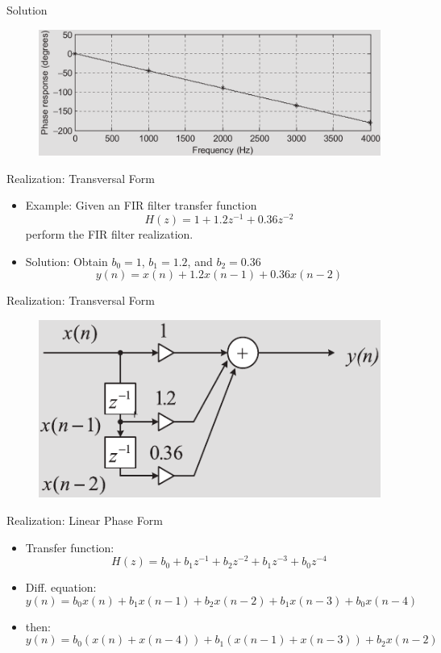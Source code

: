 \documentclass[pdflatex,compress,mathserif]{beamer}
\begin{document}
\begin{frame}{Solution}
    \begin{figure}
        \centering
        \includegraphics[width=\linewidth]{./img/img25.png}
    \end{figure}
\end{frame}

\begin{frame}{Realization: Transversal Form}
    \begin{itemize}
        \item Example: Given an FIR filter transfer function $$ H(z) = 1 + 1.2z^{-1} + 0.36z^{-2} $$ perform the FIR filter realization.
        \item Solution: Obtain $b_0 = 1$, $b_1 = 1.2$, and $b_2 = 0.36$ $$ y(n) = x(n) + 1.2x(n-1) + 0.36x(n-2) $$
    \end{itemize}
\end{frame}

\begin{frame}{Realization: Transversal Form}
    \begin{figure}
        \centering
        \includegraphics[width=0.8\linewidth]{./img/img26.png}
    \end{figure}
\end{frame}

\begin{frame}{Realization: Linear Phase Form}
    \begin{itemize}
        \item Transfer function:
        $$ H(z) = b_0 + b_1z^{-1} + b_2z^{-2} + b_1z^{-3} + b_0z^{-4} $$
        \item Diff. equation:
        $$ y(n) = b_0x(n) + b_1x(n-1) + b_2x(n-2) + b_1x(n-3) + b_0x(n-4) $$
        \item then:
        $$ y(n) = b_0(x(n) + x(n-4)) + b_1(x(n-1) + x(n-3)) + b_2x(n-2) $$
    \end{itemize}
\end{frame}
\end{document}
